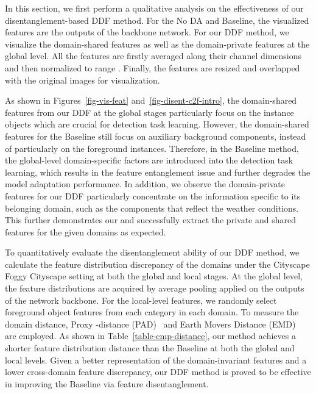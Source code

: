 \documentclass[journal]{IEEEtran}
\begin{document}
In this section, we first perform a qualitative analysis on the effectiveness of our disentanglement-based DDF method. For the No DA and Baseline, the visualized features are the outputs of the backbone network. For our DDF method, we visualize the domain-shared features as well as the domain-private features at the global level. All the features are firstly averaged along their channel dimensions and then normalized to range . Finally, the features are resized and overlapped with the original images for visualization. {\color{black}{Note that we only visualize the image-level features. The instance-level features , , , and , on the other hand, are vectors instead of tensors. Therefore, they do not have height and width and cannot be resized and overlaid on the original images for visualization.
}}


As shown in Figures~\ref{fig-vis-feat} and~\ref{fig-disent-c2f-intro}, the domain-shared features from our DDF at the global stages particularly focus on the instance objects which are crucial for detection task learning. However, the domain-shared features for the Baseline still focus on auxiliary background components, instead of particularly on the foreground instances. Therefore, in the Baseline method, the global-level domain-specific factors are introduced into the detection task learning, which results in the feature entanglement issue and further degrades the model adaptation performance. In addition, we observe the domain-private features for our DDF particularly concentrate on the information specific to its belonging domain, such as the components that reflect the weather conditions. This further demonstrates our  and  successfully extract the private and shared features for the given domains as expected.


To quantitatively evaluate the disentanglement ability of our DDF method, we calculate the feature distribution discrepancy of the domains under the Cityscape  Foggy Cityscape setting at both the global and local stages. At the global level, the feature distributions are acquired by average pooling applied on the outputs of the network backbone. For the local-level features, we randomly select  foreground object features from each category in each domain. To measure the domain distance, Proxy -distance (PAD)~\cite{ben2007analysis} and Earth Movers Distance (EMD)~\cite{rubner2000earth} are employed. As shown in Table~\ref{table-cmp-distance}, our method achieves a shorter feature distribution distance than the Baseline at both the global and local levels. Given a better representation of the domain-invariant features and a lower cross-domain feature discrepancy, our DDF method is proved to be effective in improving the Baseline via feature disentanglement.
\end{document}
